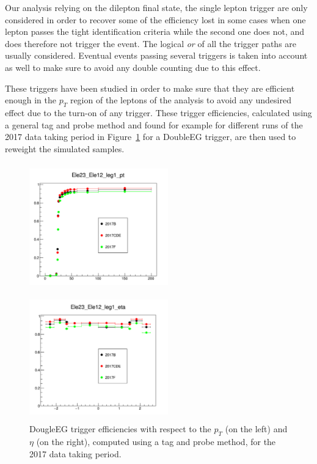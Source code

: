 \documentclass[a4paper, 10pt, openright]{report}
\begin{document}
Our analysis relying on the dilepton final state, the single lepton trigger are only considered in order to recover some of the efficiency lost in some cases when one lepton passes the tight identification criteria while the second one does not, and does therefore not trigger the event. The logical \textit{or} of all the trigger paths are usually considered. Eventual events passing several triggers is taken into account as well to make sure to avoid any double counting due to this effect.

These triggers have been studied in order to make sure that they are efficient enough in the $p_T$ region of the leptons of the analysis to avoid any undesired effect due to the turn-on of any trigger. These trigger efficiencies, calculated using a general tag and probe method and found for example for different runs of the 2017 data taking period in Figure~\ref{fig:TriggEffEle} for a DoubleEG trigger, are then used to reweight the simulated samples.

\begin{figure}[htbp]
\centering
\begin{minipage}[b]{.47\textwidth}
\includegraphics[width=6cm, height=5.5cm]{figs/TriggEffEle.png}
\end{minipage}\hfill
\begin{minipage}[b]{.47\textwidth}
\includegraphics[width=6cm, height=5.5cm]{figs/TriggEffEta.png}
\end{minipage} \hfill
\caption{DougleEG trigger efficiencies with respect to the $p_T$ (on the left) and $\eta$ (on the right), computed using a tag and probe method, for the 2017 data taking period.}
\label{fig:TriggEffEle}
\end{figure}
\end{document}
